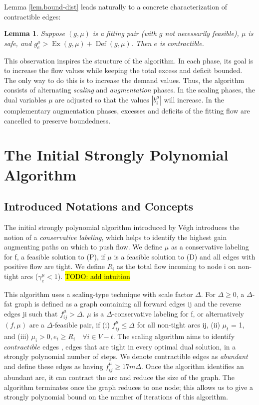 \documentclass[11pt]{article}
\newtheorem{lemma}[theorem]{Lemma}
\theoremstyle{definition}
\theoremstyle{definition}
\newcommand{\biu}{b_{i}^{\mu}}
\newcommand{\geu}{\gamma_e^{\mu}}
\DeclareMathOperator{\Ex}{Ex}
\DeclareMathOperator{\Def}{Def}
\newcommand{\todo}[1]{\hl{TODO: #1}}
\begin{document}
    Lemma \ref{lem.bound-dist} leads naturally to a concrete characterization of contractible edges:
    \begin{lemma} \label{lem.contractibility}
    Suppose $(g, \mu)$ is a fitting pair (with $g$ not necessarily feasible),
    $\mu$ is safe, and $g^\mu_e > \Ex(g, \mu) + \Def(g, \mu)$.
    Then $e$ is contractible.
    \end{lemma}
    
    This observation inspires the structure of the algorithm. In each phase, its
    goal is to increase the flow values while keeping the total excess and deficit
    bounded. The only way to do this is to increase the demand values. Thus, the algorithm
    consists of alternating \emph{scaling} and \emph{augmentation} phases. In the scaling phases, the
    dual variables $\mu$ are adjusted so that the values $|\biu|$ will increase. In the
    complementary augmentation phases, excesses and deficits of the fitting flow are
    cancelled to preserve boundedness.
	

\section{The Initial Strongly Polynomial Algorithm}
	\subsection{Introduced Notations and Concepts}
	The initial strongly polynomial algorithm introduced by Végh \cite{Vegh2013}
	introduces the notion of a \textit{conservative labeling}, which helps to
	identify the highest gain augmenting paths on which to push flow. We define
	$\mu$ as a conservative labeling for f, a feasible solution to (P), if $\mu$ is
	a feasible solution to (D) and all edges with positive flow are tight. We define $R_i$ as
	the total flow incoming to node i on non-tight arcs ($\geu < 1$). \todo{add intuition}
	
	This algorithm uses a scaling-type technique with scale factor $\Delta$.
	For $\Delta \geq 0$, a $\Delta$-fat graph is defined as a graph containing all
	forward edges ij and the reverse edges ji such that $f_{ij}^\mu > \Delta$. $\mu$
	is a $\Delta$-conservative labeling for f, or alternatively $(f, \mu)$ are a
	$\Delta$-feasible pair, if (i) $f_{ij}^\mu \leq \Delta$ for all non-tight arcs ij,
	(ii) $\mu_t$ = 1, and (iii) $\mu_i > 0, e_i \geq R_i \quad \forall i \in V -t$.
	The scaling algorithm aims to identify $\textit{contractible}$ edges \cite{Orlin1988},
	edges that are tight in every optimal dual solution, in a strongly polynomial number of steps.
	We denote contractible edges as \emph{abundant} and define these edges as having
	$f_{ij}^\mu \geq 17m\Delta$. Once the algorithm identifies an abundant arc,
	it can contract the arc and reduce the size of the graph. The algorithm
	terminates once the graph reduces to one node; this allows us to give a
	strongly polynomial bound on the number of iterations of this algorithm.
\end{document}
